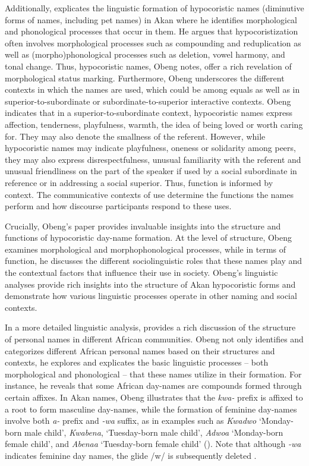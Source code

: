 \documentclass[output=paper,colorlinks,citecolor=brown]{langscibook}
\begin{document}
\begin{sloppypar}
Additionally, \citet{Obeng1997} explicates the linguistic formation of  hypocoristic names (diminutive forms of names, including pet names) in Akan where he identifies morphological and phonological processes that occur in them. He argues that hypocoristization often involves morphological processes such as compounding and reduplication as well as (morpho)phonological processes such as deletion, vowel harmony, and tonal change. Thus, hypocoristic names, Obeng notes, offer a rich revelation of morphological status marking. Furthermore, Obeng underscores the different contexts in which the names are used, which could be among equals as well as in superior-to-subordinate or subordinate-to-superior interactive contexts. Obeng indicates that in a superior-to-subordinate context, hypocoristic names express affection, tenderness, playfulness, warmth, the idea of being loved or worth caring for. They may also denote the smallness of the referent. However, while hypocoristic names may indicate playfulness, oneness or solidarity among peers, they may also express disrespectfulness, unusual familiarity with the referent and unusual friendliness on the part of the speaker if used by a social subordinate in reference or in addressing a social superior. Thus, function is informed by context. The communicative contexts of use determine the functions the names perform and how discourse participants respond to these uses. 
\end{sloppypar}

Crucially, Obeng’s paper provides invaluable insights into the structure and functions of hypocoristic day-name formation. At the level of structure, Obeng examines morphological and morphophonological processes, while in terms of function, he discusses the different sociolinguistic roles that these names play and the contextual factors that influence their use in  society. Obeng’s linguistic analyses provide rich insights into the structure of Akan hypocoristic forms and demonstrate how various linguistic processes operate in other naming and social contexts.

In a more detailed linguistic analysis, \citet{Obeng2001} provides a rich discussion of the structure of personal names in different African communities. Obeng not only identifies and categorizes different African personal names based on their structures and contexts, he explores and explicates the basic linguistic processes – both morphological and phonological – that these names utilize in their formation. For instance, he reveals that some African day-names are compounds formed through certain affixes. In Akan names, Obeng illustrates that the \textit{kwa-} prefix is affixed to a root to form masculine day-names, while the formation of feminine day-names involve both \textit{a-} prefix and \textit{-wa} suffix, as in examples such as \textit{Kwadwo} `Monday-born male child', \textit{Kwabena}, `Tuesday-born male child', \textit{Adwoa} `Monday-born female child', and \textit{Abenaa} `Tuesday-born female child' (\citealt[10]{Obeng2001}). Note that although  \textit{-wa} indicates feminine day names, the glide /w/ is subsequently deleted \citeyearpar[11]{Obeng2001}. 
\end{document}
